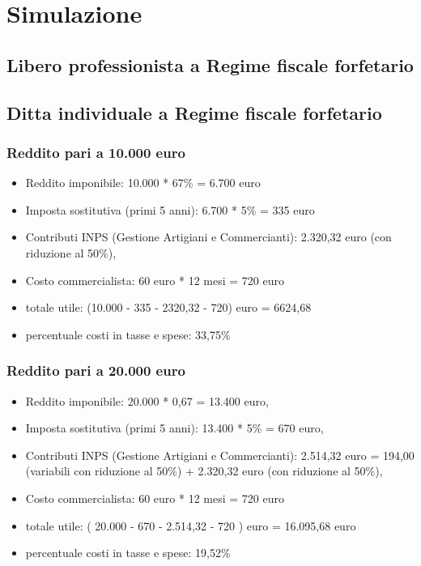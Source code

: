 \documentclass{article}
\begin{document}
\section{Simulazione}

\subsection{Libero professionista a Regime fiscale forfetario}

\subsection{Ditta individuale a Regime fiscale forfetario}

\subsubsection{Reddito pari a 10.000 euro}
\begin{itemize}
    \item Reddito imponibile: 10.000 * 67\% = 6.700 euro
    \item Imposta sostitutiva (primi 5 anni): 6.700 * 5\% = 335 euro
    \item Contributi INPS (Gestione Artigiani e Commercianti): 2.320,32 euro (con riduzione al 50\%), 
    \item Costo commercialista: 60 euro * 12 mesi = 720 euro
    \item totale utile: (10.000 - 335 - 2320,32 - 720) euro = 6624,68
    \item percentuale costi in tasse e spese: 33,75\%
\end{itemize}

\subsubsection{Reddito pari a 20.000 euro}
\begin{itemize}
    \item Reddito imponibile: 20.000 * 0,67 = 13.400 euro,
    \item Imposta sostitutiva (primi 5 anni): 13.400 * 5\% = 670 euro,
    \item Contributi INPS (Gestione Artigiani e Commercianti): 2.514,32 euro = 194,00 (variabili con riduzione al 50\%) + 2.320,32 euro (con riduzione al 50\%),
    \item Costo commercialista: 60 euro * 12 mesi = 720 euro
    \item totale utile: ( 20.000 - 670 - 2.514,32 - 720 ) euro = 16.095,68 euro
    \item percentuale costi in tasse e spese: 19,52\%
\end{itemize}
\end{document}
